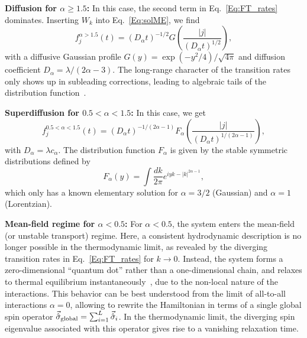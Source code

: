 \documentclass[aps,10pt,reprint,groupedaddress,superscriptaddress]{revtex4-2}
\begin{document}
\textbf{Diffusion for $\alpha \geq 1.5$: }In this case, the second term in Eq.~\eqref{Eq:FT_rates} dominates. Inserting $W_k$ into Eq.~\eqref{Eq:solME}, we find
\begin{equation}
    f_j^{\alpha>1.5}(t)= (D_\alpha t)^{-1/2} G\left( \frac{|j|}{(D_\alpha t)^{1/2}}\right),
\end{equation}
with a diffusive Gaussian profile $G(y)=\exp(-y^2/4)/\sqrt{4\pi}$ and diffusion coefficient $D_\alpha=\lambda/(2\alpha-3)$. The long-range character of the transition rates only shows up in subleading corrections, leading to algebraic tails of the distribution function~\cite{PhysRevE.100.042140, PhysRevB.101.020416}.

\textbf{Superdiffusion for $0.5<\alpha<1.5$: }In this case, we get 
\begin{equation}
    f_j^{0.5<\alpha<1.5}(t)= (D_\alpha t)^{-1/(2\alpha-1)} F_\alpha\left( \frac{|j|}{(D_\alpha t)^{1/(2\alpha-1)}}\right),
\end{equation}
with $D_\alpha=\lambda c_\alpha$. The distribution function $F_\alpha$ is given by the stable symmetric distributions defined by
\begin{equation}
    F_\alpha(y)=\int \frac{dk}{2\pi} e^{iyk-|k|^{2\alpha-1}},
    \label{eq:F_alpha}
\end{equation}
which only has a known elementary solution for $\alpha=3/2$ (Gaussian) and $\alpha=1$ (Lorentzian).

\textbf{Mean-field regime for $\alpha<0.5$: }For $\alpha<0.5$, the system enters the mean-field (or unstable transport) regime. Here, a consistent hydrodynamic description is no longer possible in the thermodynamic limit, as revealed by the diverging transition rates in Eq.~\eqref{Eq:FT_rates} for $k\rightarrow 0$. Instead, the system forms a zero-dimensional ``quantum dot'' rather than a one-dimensional chain, and relaxes to thermal equilibrium instantaneously~\cite{PhysRevB.101.020416,PhysRevLett.110.170603}, due to the non-local nature of the interactions. This behavior can be best understood from the limit of all-to-all interactions $\alpha=0$, allowing to rewrite the Hamiltonian in terms of a single global spin operator $\vec{\hat \sigma}_{\rm global} =\sum_{i =1}^L\vec{\hat \sigma}_i$. In the thermodynamic limit, the diverging spin eigenvalue associated with this operator gives rise to a vanishing relaxation time.
\end{document}
